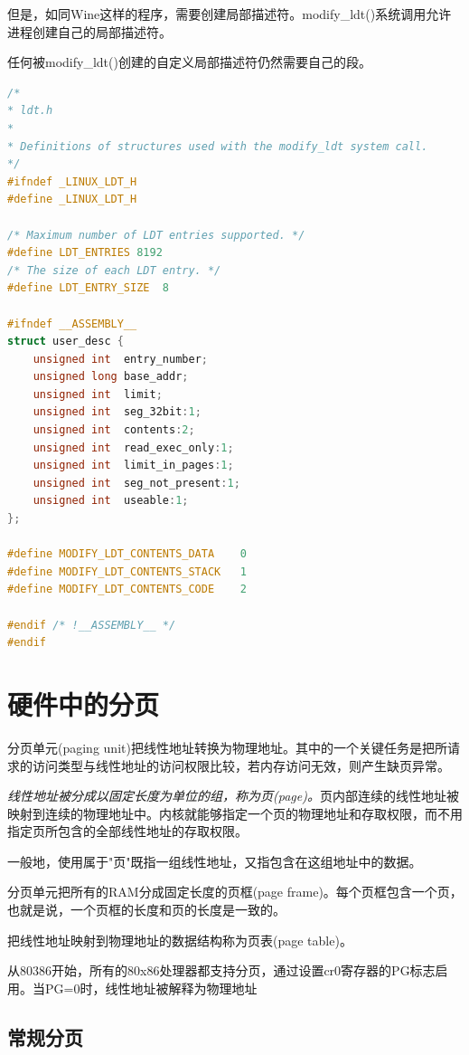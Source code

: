     但是，如同Wine这样的程序，需要创建局部描述符。modify\_ldt()系统调用允许进程创建自己的局部描述符。

    任何被modify\_ldt()创建的自定义局部描述符仍然需要自己的段。

\begin{lstlisting}[language=C++]
/*
* ldt.h
*
* Definitions of structures used with the modify_ldt system call.
*/
#ifndef _LINUX_LDT_H
#define _LINUX_LDT_H

/* Maximum number of LDT entries supported. */
#define LDT_ENTRIES	8192
/* The size of each LDT entry. */
#define LDT_ENTRY_SIZE	8

#ifndef __ASSEMBLY__
struct user_desc {
    unsigned int  entry_number;
    unsigned long base_addr;
    unsigned int  limit;
    unsigned int  seg_32bit:1;
    unsigned int  contents:2;
    unsigned int  read_exec_only:1;
    unsigned int  limit_in_pages:1;
    unsigned int  seg_not_present:1;
    unsigned int  useable:1;
};

#define MODIFY_LDT_CONTENTS_DATA	0
#define MODIFY_LDT_CONTENTS_STACK	1
#define MODIFY_LDT_CONTENTS_CODE	2

#endif /* !__ASSEMBLY__ */
#endif  
\end{lstlisting}

\section{硬件中的分页}

    分页单元(paging unit)把线性地址转换为物理地址。其中的一个关键任务是把所请求的访问类型与线性地址的访问权限比较，若内存访问无效，则产生缺页异常。

    \emph{线性地址被分成以固定长度为单位的组，称为页(page)。}页内部连续的线性地址被映射到连续的物理地址中。内核就能够指定一个页的物理地址和存取权限，而不用指定页所包含的全部线性地址的存取权限。

    一般地，使用属于"页"既指一组线性地址，又指包含在这组地址中的数据。

    分页单元把所有的RAM分成固定长度的页框(page frame)。每个页框包含一个页，也就是说，一个页框的长度和页的长度是一致的。

    把线性地址映射到物理地址的数据结构称为页表(page table)。

    从80386开始，所有的80x86处理器都支持分页，通过设置cr0寄存器的PG标志启用。当PG=0时，线性地址被解释为物理地址

\subsection{常规分页}

